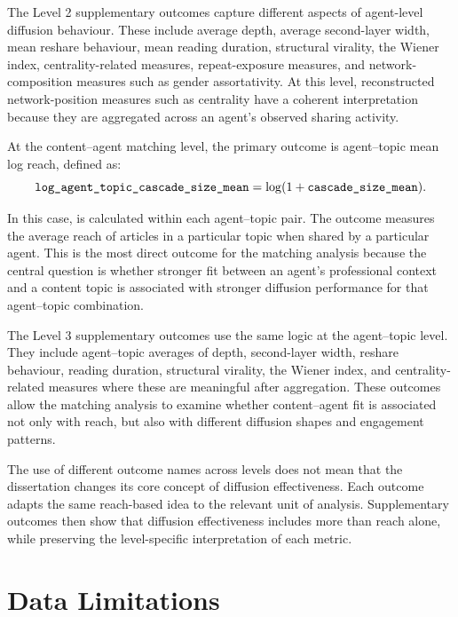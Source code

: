 The Level 2 supplementary outcomes capture different aspects of agent-level diffusion behaviour. These include average depth, average second-layer width, mean reshare behaviour, mean reading duration, structural virality, the Wiener index, centrality-related measures, repeat-exposure measures, and network-composition measures such as gender assortativity. At this level, reconstructed network-position measures such as centrality have a coherent interpretation because they are aggregated across an agent’s observed sharing activity.

At the content–agent matching level, the primary outcome is agent–topic mean log reach, defined as:
\begin{equation}
\varname{log\_agent\_topic\_cascade\_size\_mean}
= \log(1 + \varname{cascade\_size\_mean}).
\end{equation}

In this case,  is calculated within each agent–topic pair. The outcome measures the average reach of articles in a particular topic when shared by a particular agent. This is the most direct outcome for the matching analysis because the central question is whether stronger fit between an agent’s professional context and a content topic is associated with stronger diffusion performance for that agent–topic combination.

The Level 3 supplementary outcomes use the same logic at the agent–topic level. They include agent–topic averages of depth, second-layer width, reshare behaviour, reading duration, structural virality, the Wiener index, and centrality-related measures where these are meaningful after aggregation. These outcomes allow the matching analysis to examine whether content–agent fit is associated not only with reach, but also with different diffusion shapes and engagement patterns.

The use of different outcome names across levels does not mean that the dissertation changes its core concept of diffusion effectiveness. Each outcome adapts the same reach-based idea to the relevant unit of analysis. Supplementary outcomes then show that diffusion effectiveness includes more than reach alone, while preserving the level-specific interpretation of each metric.

\section{Data Limitations}
\label{sec:3-6-data-limitations}

